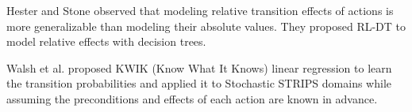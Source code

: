 Hester and Stone \cite{Hester09} observed that modeling relative transition effects of actions
is more generalizable than modeling their absolute values. They proposed RL-DT to model relative
effects with decision trees.

Walsh et al. \cite{Walsh09} proposed KWIK (Know What It Knows) linear regression
to learn the transition probabilities and applied it to Stochastic STRIPS domains while
assuming the preconditions and effects of each action are known in advance. 












